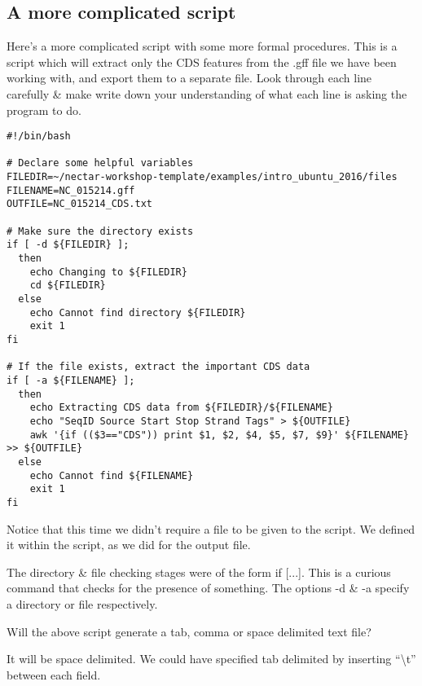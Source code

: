 \clearpage
\subsection*{A more complicated script}

Here's a more complicated script with some more formal procedures.
This is a script which will extract only the CDS features from the .gff file we have been working with, and export them to a separate file.
Look through each line carefully \& make write down your understanding of what each line is asking the program to do.

\begin{lstlisting}
#!/bin/bash

# Declare some helpful variables
FILEDIR=~/nectar-workshop-template/examples/intro_ubuntu_2016/files
FILENAME=NC_015214.gff
OUTFILE=NC_015214_CDS.txt

# Make sure the directory exists
if [ -d ${FILEDIR} ];
  then
    echo Changing to ${FILEDIR}
    cd ${FILEDIR}
  else
    echo Cannot find directory ${FILEDIR}
    exit 1
fi

# If the file exists, extract the important CDS data
if [ -a ${FILENAME} ];
  then
    echo Extracting CDS data from ${FILEDIR}/${FILENAME}
    echo "SeqID Source Start Stop Strand Tags" > ${OUTFILE}
    awk '{if (($3=="CDS")) print $1, $2, $4, $5, $7, $9}' ${FILENAME} >> ${OUTFILE}
  else
    echo Cannot find ${FILENAME}
    exit 1
fi
\end{lstlisting}

Notice that this time we didn't require a file to be given to the script.
We defined it within the script, as we did for the output file.

\begin{information}
The directory \& file checking stages were of the form if [...].
This is a curious command that checks for the presence of something. 
The options -d \& -a specify a directory or file respectively.
\end{information}

\begin{questions}
Will the above script generate a tab, comma or space delimited text file? \\
\begin{answer}
It will be space delimited. 
We could have specified tab delimited by inserting ``\textbackslash t'' between each field.
\end{answer}
\end{questions}


